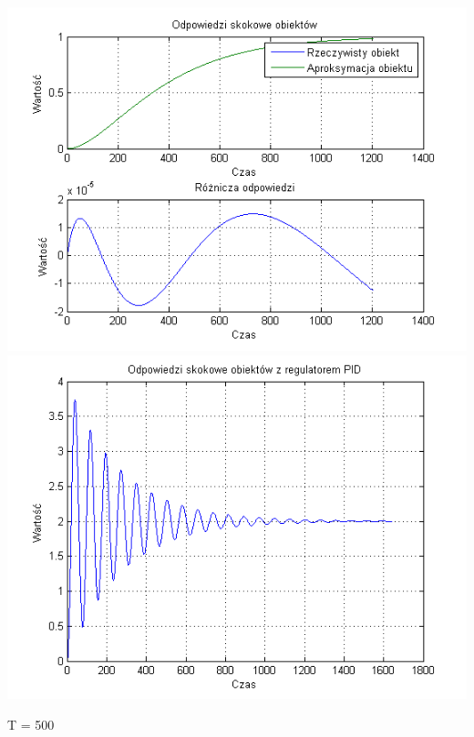 \documentclass[10pt,a4paper]{article}
\begin{document}
\begin{center}
\includegraphics[scale=1]{images/dwa/skrypt_81.png}\\
\includegraphics[scale=1]{images/dwa/skrypt_82.png}\\
\end{center}
\newpage
T = 500
\end{document}
